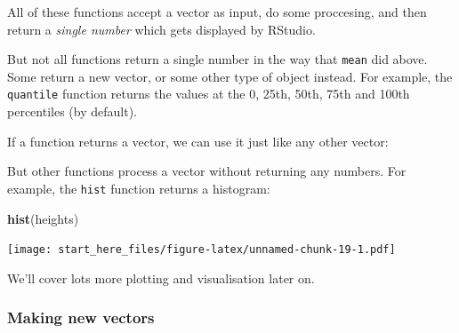 \documentclass[]{article}
\newenvironment{Shaded}{\begin{snugshade}}{\end{snugshade}}
\newcommand{\KeywordTok}[1]{\textcolor[rgb]{0.13,0.29,0.53}{\textbf{#1}}}
\newcommand{\DecValTok}[1]{\textcolor[rgb]{0.00,0.00,0.81}{#1}}
\newcommand{\StringTok}[1]{\textcolor[rgb]{0.31,0.60,0.02}{#1}}
\newcommand{\CommentTok}[1]{\textcolor[rgb]{0.56,0.35,0.01}{\textit{#1}}}
\newcommand{\NormalTok}[1]{#1}
\theoremstyle{definition}
\theoremstyle{definition}
\theoremstyle{definition}
\theoremstyle{remark}
\begin{document}
All of these functions accept a vector as input, do some proccesing, and
then return a \emph{single number} which gets displayed by RStudio.

But not all functions return a single number in the way that
\texttt{mean} did above. Some return a new vector, or some other type of
object instead. For example, the \texttt{quantile} function returns the
values at the 0, 25th, 50th, 75th and 100th percentiles (by default).

\begin{Shaded}
\end{Shaded}

If a function returns a vector, we can use it just like any other
vector:

\begin{Shaded}
\end{Shaded}

But other functions process a vector without returning any numbers. For
example, the \texttt{hist} function returns a histogram:

\begin{Shaded}
\begin{Highlighting}[]
\KeywordTok{hist}\NormalTok{(heights)}
\end{Highlighting}
\end{Shaded}

\texttt{[image: start\_here\_files/figure-latex/unnamed-chunk-19-1.pdf]}

We'll cover lots more plotting and visualisation later on.

\subsubsection*{Making new vectors}\label{making-new-vectors}
\end{document}

